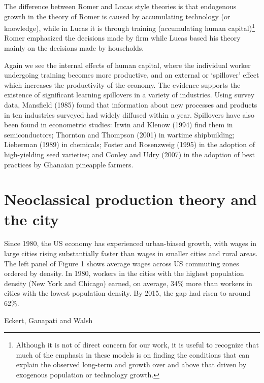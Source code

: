The difference between Romer and Lucas style theories is that endogenous growth in the theory of Romer is caused by accumulating technology (or knowledge), while in Lucas it is through training (accumulating human capital)\footnote{Although it is not of direct concern for our work, it is useful to recognize that much of the emphasis in these models is on finding the conditions that can explain the observed long-term  and growth over and above that driven by exogenous population or technology growth. } Romer  emphasized the decisions made by firm while Lucas  based his theory mainly on the decisions made by households. 


Again we see the  internal effects of human capital, where the individual worker undergoing training becomes more productive, and an external or `spillover' effect which increases the productivity of the economy. 
The evidence supports the existence of significant learning spillovers in a variety of industries. Using survey data, Mansfield (1985) found that information about new processes and products in ten industries surveyed had widely diffused within a year. Spillovers have also been found in econometric studies: Irwin and Klenow (1994) find them in semiconductors; Thornton and Thompson (2001) in wartime shipbuilding; Lieberman (1989) in chemicals; Foster and Rosenzweig (1995) in the adoption of high-yielding seed varieties; and Conley and Udry (2007) in the adoption of best practices by Ghanaian pineapple farmers. 

\section{Neoclassical production theory and the city}

\epigraph{Since 1980, the US economy has experienced urban-biased growth, with wages in large cities rising substantially faster than wages in smaller cities and rural areas. The left panel of Figure 1 shows average wages across US commuting zones ordered by density. In 1980, workers in the cities with the highest population density (New York and Chicago) earned, on average, 34\% more than workers in cities with the lowest population density. By 2015, the gap had risen to around 62\%.}{Eckert, Ganapati and Walsh \cite{eckertUrbanBiasedGrowthMacroeconomic2022}}


